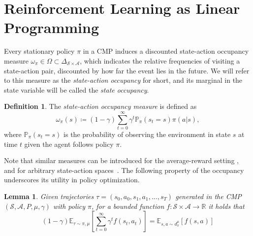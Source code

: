 \documentclass{article}
\theoremstyle{plain}
\newtheorem{lemma}[theorem]{Lemma}
\theoremstyle{definition}
\newtheorem{definition}[theorem]{Definition}
\theoremstyle{remark}
\newcommand{\sS}{\mathcal{S}}
\newcommand{\sA}{\mathcal{A}}
\begin{document}



\appendix

\section{Reinforcement Learning as Linear Programming}\label{app:rl-as-linear-programming}
Every stationary policy $\pi$ in a CMP induces a discounted state-action occupancy measure $\omega_\pi\in\Omega\subset\Delta_{\mathcal S\times\mathcal A}$, which indicates the relative frequencies of visiting a state-action pair, discounted by how far the event lies in the future. We will refer to this measure as the \emph{state-action occupancy} for short, and its marginal in the state variable will be called the \emph{state occupancy}.
\begin{definition}
    The \emph{state-action occupancy measure} is defined as
    \begin{equation}
        \omega_\pi(s)\coloneqq (1-\gamma)
        \sum_{t=0}^\infty \gamma^t \mathbb{P}_\pi (s_t = s)\pi(a|s),
    \end{equation}
    where $\mathbb{P}_\pi (s_t = s)$ is the probability of observing the environment in state $s$ at time $t$ given the agent follows policy $\pi$.
\end{definition}
Note that similar measures can be introduced for the average-reward setting \citep{zahavy2021reward}, and for arbitrary state-action spaces~\citep{laroche23occupancy}. The following property of the occupancy underscores its utility in policy optimization.

\begin{lemma}\label{eq:discounted-expectation}
Given trajectories $\tau=(s_0,a_0,s_1,a_1,...,s_T)$ generated in the CMP $(\sS,\sA,P,\mu,\gamma)$ with policy $\pi$, for a bounded function $f:\sS\times\sA\to\mathbb{R}$ it holds that
    \begin{equation}
        (1-\gamma)\mathbb{E}_{\tau \sim \pi,\mu} \left[ \sum_{t=0}^\infty \gamma^t f(s_t, a_t) \right] = \mathbb{E}_{s, a \sim d^\mu_\pi} [f(s, a)]
    \end{equation}
\end{lemma}
\end{document}
